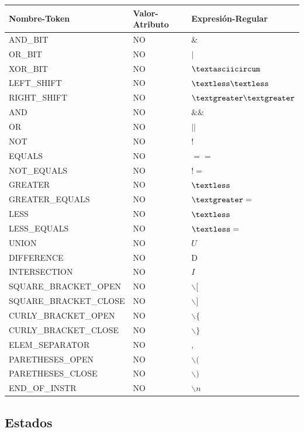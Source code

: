 \documentclass[11pt, english]{article}
\begin{document}
	\begin{table}[H]
		\begin{tabular}{l|l|l}
			\toprule
			\textbf{Nombre-Token} & \textbf{Valor-Atributo} & \textbf{Expresión-Regular}\\
			\midrule
			AND\_BIT & NO & $\&$ \\
			OR\_BIT & NO & $|$  \\
			XOR\_BIT & NO & $\textasciicircum$ \\
			LEFT\_SHIFT & NO & $\textless\textless$ \\
			RIGHT\_SHIFT & NO & $\textgreater\textgreater$ \\
			AND & NO & $\&\&$ \\
			OR & NO & $||$ \\
			NOT & NO & $!$ \\
			EQUALS & NO & $==$ \\
			NOT\_EQUALS & NO & $!=$ \\
			GREATER & NO & $\textless$ \\
			GREATER\_EQUALS & NO & $\textgreater=$ \\
			LESS & NO & $\textless$ \\
			LESS\_EQUALS & NO & $\textless=$ \\
			UNION & NO & $U$ \\
			DIFFERENCE & NO & D \\
			INTERSECTION & NO & $I$ \\
			SQUARE\_BRACKET\_OPEN & NO & $\backslash [$ \\
			SQUARE\_BRACKET\_CLOSE & NO & $\backslash ]$ \\
			CURLY\_BRACKET\_OPEN & NO & $\backslash \{$ \\
			CURLY\_BRACKET\_CLOSE & NO & $\backslash \}$ \\
			ELEM\_SEPARATOR & NO & $,$ \\
			PARETHESES\_OPEN & NO & $\backslash($ \\
			PARETHESES\_CLOSE & NO & $\backslash)$ \\
			END\_OF\_INSTR & NO & $\backslash n$ \\
			\bottomrule
		\end{tabular}
	\end{table}
	
	\newpage
	
	\subsection{Estados}\label{Estados}
	
\end{document}
